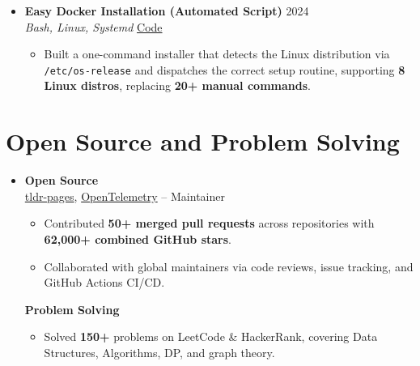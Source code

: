 \documentclass[a4paper]{article}
\newcommand{\resumeItem}[1]{
  \item\small{
    {#1 \vspace{-2pt}}
  }
}
\newcommand{\resumeItemListStart}{\begin{itemize}}
\newcommand{\resumeItemListEnd}{\end{itemize}\vspace{-5pt}}
\newcommand{\subheading}[1]{\noindent \textbf{#1} \\}
\begin{document}
\begin{itemize}[leftmargin=0.15in, label={}, itemsep=6pt]
    \item
    \textbf{Easy Docker Installation (Automated Script)} \hfill 2024\\
    \small\textit{Bash, Linux, Systemd} \hfill
    \href{https://github.com/badhon495/Easy_Docker_Installation}{Code}
    \vspace{-5pt}
    \resumeItemListStart
      \resumeItem{Built a one-command installer that detects the Linux distribution via \texttt{/etc/os-release} and dispatches the correct setup routine, supporting \textbf{8 Linux distros}, replacing \textbf{20+ manual commands}.}
    \resumeItemListEnd

  \end{itemize}




\section{Open Source and Problem Solving}
\begin{itemize}[leftmargin=0.15in, label={}, parsep=0pt]
\item
\small
\subheading{Open Source}
\href{https://github.com/tldr-pages/tldr}{tldr-pages}, \href{https://github.com/open-telemetry}{OpenTelemetry} --
Maintainer
\begin{itemize}[noitemsep, topsep=0pt]
    \item Contributed \textbf{50+ merged pull requests} across repositories with \textbf{62,000+ combined GitHub stars}.
    \item Collaborated with global maintainers via code reviews, issue tracking, and GitHub Actions CI/CD.
\end{itemize}

\vspace{0.5em}

\subheading{Problem Solving}
\begin{itemize}[noitemsep, topsep=0pt, partopsep=0pt]
\item Solved \textbf{150+} problems on LeetCode \& HackerRank, covering Data Structures, Algorithms, DP, and graph theory.
\end{itemize}
\end{itemize}




\end{document}
